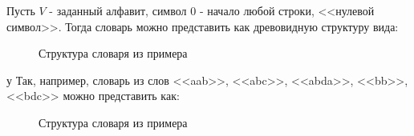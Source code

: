 \documentclass[a4paper,12pt]{article}
\begin{document}
Пусть $V$ - заданный алфавит, символ $0$ - начало любой строки, <<нулевой символ>>. Тогда словарь можно представить как древовидную структуру вида: \\
\begin{figure}[H]
\caption{Структура словаря из примера}
\label{images:tree1}
\end{figure}у
Так, например, словарь из слов <<aab>>, <<abc>>, <<abda>>, <<bb>>, <<bdc>> можно представить как:
\begin{figure}[H]
\caption{Структура словаря из примера}
\label{images:tree2}
\end{figure}
\end{document}
